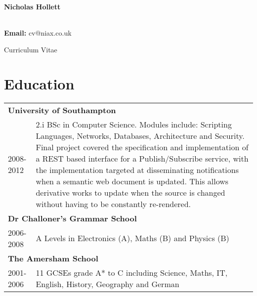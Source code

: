 \documentclass[11pt]{report}
\begin{document}
\pagestyle{empty}
\begin{center}
\begin{LARGE}
{\bf Nicholas Hollett}
\end{LARGE}\\
{\bf Email:} {\ttfamily cv@niax.co.uk}\\[3pt]
\begin{large}
Curriculum Vitae
\end{large}
\end{center}
\section*{Education}
\begin{tabularx}{\textwidth}{ l X }
\multicolumn{2}{l}{\bf University of Southampton} \\
2008-2012 & 
2.i BSc in Computer Science.
Modules include: Scripting Languages, Networks, Databases, Architecture and Security.
Final project covered the specification and implementation of a REST based interface for a Publish/Subscribe service,
with the implementation targeted at disseminating notifications when a semantic web document is updated.
This allows derivative works to update when the source is changed without having to be constantly re-rendered.\\
\multicolumn{2}{l}{\bf Dr Challoner's Grammar School} \\
2006-2008 & A Levels in Electronics (A), Maths (B) and Physics (B) \\
\multicolumn{2}{l}{\bf The Amersham School} \\
2001-2006 & 11 GCSEs grade A* to C including Science, Maths, IT, English, History, Geography and German
\end{tabularx}
\end{document}
